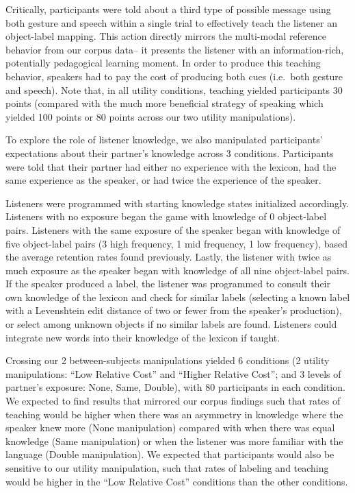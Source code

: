 \documentclass[english,,man,floatsintext]{apa6}
\begin{document}
Critically, participants were told about a third type of possible message using both gesture and speech within a single trial to effectively teach the listener an object-label mapping. This action directly mirrors the multi-modal reference behavior from our corpus data-- it presents the listener with an information-rich, potentially pedagogical learning moment. In order to produce this teaching behavior, speakers had to pay the cost of producing both cues (i.e.~both gesture and speech). Note that, in all utility conditions, teaching yielded participants 30 points (compared with the much more beneficial strategy of speaking which yielded 100 points or 80 points across our two utility manipulations).

To explore the role of listener knowledge, we also manipulated participants' expectations about their partner's knowledge across 3 conditions. Participants were told that their partner had either no experience with the lexicon, had the same experience as the speaker, or had twice the experience of the speaker.

Listeners were programmed with starting knowledge states initialized accordingly. Listeners with no exposure began the game with knowledge of 0 object-label pairs. Listeners with the same exposure of the speaker began with knowledge of five object-label pairs (3 high frequency, 1 mid frequency, 1 low frequency), based the average retention rates found previously. Lastly, the listener with twice as much exposure as the speaker began with knowledge of all nine object-label pairs. If the speaker produced a label, the listener was programmed to consult their own knowledge of the lexicon and check for similar labels (selecting a known label with a Levenshtein edit distance of two or fewer from the speaker's production), or select among unknown objects if no similar labels are found. Listeners could integrate new words into their knowledge of the lexicon if taught.

Crossing our 2 between-subjects manipulations yielded 6 conditions (2 utility manipulations: \enquote{Low Relative Cost} and \enquote{Higher Relative Cost}; and 3 levels of partner's exposure: None, Same, Double), with 80 participants in each condition. We expected to find results that mirrored our corpus findings such that rates of teaching would be higher when there was an asymmetry in knowledge where the speaker knew more (None manipulation) compared with when there was equal knowledge (Same manipulation) or when the listener was more familiar with the language (Double manipulation). We expected that participants would also be sensitive to our utility manipulation, such that rates of labeling and teaching would be higher in the \enquote{Low Relative Cost} conditions than the other conditions.
\end{document}

